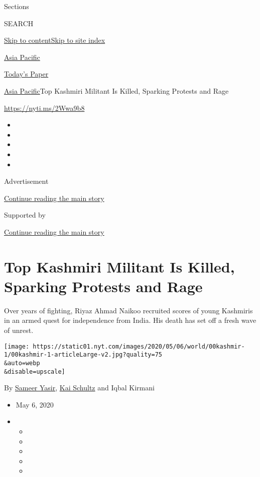 Sections

SEARCH

\protect\hyperlink{site-content}{Skip to
content}\protect\hyperlink{site-index}{Skip to site index}

\href{https://www.nytimes.com/section/world/asia}{Asia Pacific}

\href{https://myaccount.nytimes.com/auth/login?response_type=cookie\&client_id=vi}{}

\href{https://www.nytimes.com/section/todayspaper}{Today's Paper}

\href{/section/world/asia}{Asia Pacific}\textbar{}Top Kashmiri Militant
Is Killed, Sparking Protests and Rage

\url{https://nyti.ms/2Wwa9b8}

\begin{itemize}
\item
\item
\item
\item
\item
\end{itemize}

Advertisement

\protect\hyperlink{after-top}{Continue reading the main story}

Supported by

\protect\hyperlink{after-sponsor}{Continue reading the main story}

\hypertarget{top-kashmiri-militant-is-killed-sparking-protests-and-rage}{%
\section{Top Kashmiri Militant Is Killed, Sparking Protests and
Rage}\label{top-kashmiri-militant-is-killed-sparking-protests-and-rage}}

Over years of fighting, Riyaz Ahmad Naikoo recruited scores of young
Kashmiris in an armed quest for independence from India. His death has
set off a fresh wave of unrest.

\texttt{[image: https://static01.nyt.com/images/2020/05/06/world/00kashmir-1/00kashmir-1-articleLarge-v2.jpg?quality=75\\\&auto=webp\\\&disable=upscale]}

By \href{https://www.nytimes.com/by/sameer-yasir}{Sameer Yasir},
\href{https://www.nytimes.com/by/kai-schultz}{Kai Schultz} and Iqbal
Kirmani

\begin{itemize}
\item
  May 6, 2020
\item
  \begin{itemize}
  \item
  \item
  \item
  \item
  \item
  \end{itemize}
\end{itemize}


